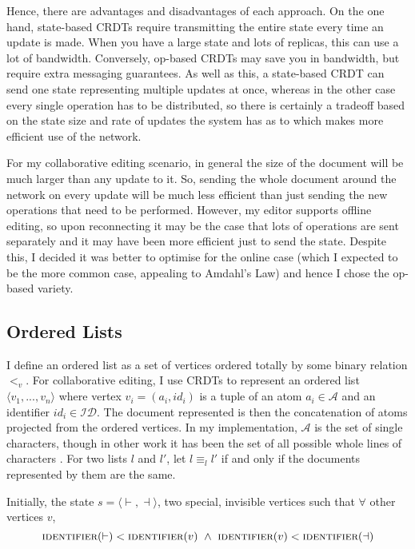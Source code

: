 \documentclass[diss.tex]{subfiles}
\begin{document}
Hence, there are advantages and disadvantages of each approach. On the one hand, state-based CRDTs require transmitting the entire state every time an update is made. When you have a large state and lots of replicas, this can use a lot of bandwidth. Conversely, op-based CRDTs may save you in bandwidth, but require extra messaging guarantees. As well as this, a state-based CRDT can send one state representing multiple updates at once, whereas in the other case every single operation has to be distributed, so there is certainly a tradeoff based on the state size and rate of updates the system has as to which makes more efficient use of the network.

For my collaborative editing scenario, in general the size of the document will be much larger than any update to it. So, sending the whole document around the network on every update will be much less efficient than just sending the new operations that need to be performed. However, my editor supports offline editing, so upon reconnecting it may be the case that lots of operations are sent separately and it may have been more efficient just to send the state. Despite this, I decided it was better to optimise for the online case (which I expected to be the more common case, appealing to Amdahl's Law) and hence I chose the op-based variety.

\subsection{Ordered Lists}
 
I define an ordered list as a set of vertices ordered totally by some binary relation $<_v$. For collaborative editing, I use CRDTs to represent an ordered list $\langle v_1, ..., v_n\rangle$ where vertex $v_i = (a_i, id_i)$ is a tuple of an atom $a_i \in \mathcal{A}$ and an identifier $id_i \in \mathcal{ID}$. The document represented is then the concatenation of atoms projected from the ordered vertices. In my implementation, $\mathcal{A}$ is the set of single characters, though in other work it has been the set of all possible whole lines of characters \cite{logoot}. For two lists $l$ and $l'$, let $l \equiv_l l'$ if and only if the documents represented by them are the same.

Initially, the state $s = \langle \vdash, \dashv\rangle$, two special, invisible vertices such that $\forall $ other vertices $v$,  $$\textsc{identifier}(\vdash) < \textsc{identifier}(v) ~\wedge~ \textsc{identifier}(v) <\textsc{identifier}(\dashv)$$
\end{document}

